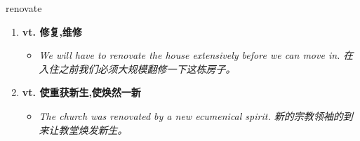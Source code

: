 
\begin{frame}
{\huge renovate}
\begin{center}
\begin{enumerate}\Large
  \item \textbf{vt. 修复,维修}
  \begin{itemize}
    \item \em{\Large{We will have to renovate the house extensively before we can move in. 在入住之前我们必须大规模翻修一下这栋房子。}}
  \end{itemize}
  \item \textbf{vt. 使重获新生,使焕然一新}
  \begin{itemize}
    \item \em{\Large{The church was renovated by a new ecumenical spirit. 新的宗教领袖的到来让教堂焕发新生。}}
  \end{itemize}
\end{enumerate}
\end{center}
\end{frame}
